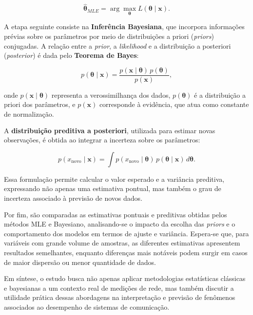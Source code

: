 \documentclass{article}
\begin{document}
\begin{equation}
	\hat{\boldsymbol{\theta}}_{MLE} = \arg\max_{\boldsymbol{\theta}} L(\boldsymbol{\theta} \mid \mathbf{x}).
	\label{eq:theta_mle}
\end{equation}

A etapa seguinte consiste na \textbf{Inferência Bayesiana}, que incorpora informações prévias
sobre os parâmetros por meio de distribuições a priori (\textit{priors}) conjugadas. A relação
entre a \textit{prior}, a \textit{likelihood} e a distribuição a posteriori (\textit{posterior}) é dada pelo
\textbf{Teorema de Bayes}:

\begin{equation}
	p(\boldsymbol{\theta} \mid \mathbf{x}) =
	\frac{p(\mathbf{x} \mid \boldsymbol{\theta}) \, p(\boldsymbol{\theta})}{p(\mathbf{x})},
	\label{eq:bayes_theorem}
\end{equation}

onde $p(\mathbf{x} \mid \boldsymbol{\theta})$ representa a verossimilhança dos dados,
$p(\boldsymbol{\theta})$ é a distribuição a priori dos parâmetros, e $p(\mathbf{x})$
corresponde à evidência, que atua como constante de normalização.

A \textbf{distribuição preditiva a posteriori}, utilizada para estimar novas observações,
é obtida ao integrar a incerteza sobre os parâmetros:

\begin{equation}
	p(x_{\text{novo}} \mid \mathbf{x}) =
	\int p(x_{\text{novo}} \mid \boldsymbol{\theta}) \, p(\boldsymbol{\theta} \mid \mathbf{x}) \, d\boldsymbol{\theta}.
	\label{eq:posterior_predictive}
\end{equation}

Essa formulação permite calcular o valor esperado e a variância preditiva,
expressando não apenas uma estimativa pontual, mas também o grau de incerteza
associado à previsão de novos dados.

Por fim, são comparadas as estimativas pontuais e preditivas obtidas pelos métodos MLE e
Bayesiano, analisando-se o impacto da escolha das \textit{priors} e o comportamento dos modelos
em termos de ajuste e variância. Espera-se que, para variáveis com grande volume de amostras,
as diferentes estimativas apresentem resultados semelhantes, enquanto
diferenças mais notáveis podem surgir em casos de maior dispersão ou menor quantidade de
dados.

Em síntese, o estudo busca não apenas aplicar metodologias estatísticas clássicas e bayesianas
a um contexto real de medições de rede, mas também discutir a utilidade prática dessas
abordagens na interpretação e previsão de fenômenos associados ao desempenho de sistemas
de comunicação.
\end{document}
